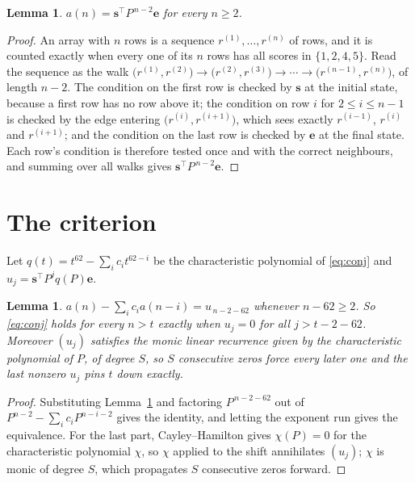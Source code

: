 \documentclass[11pt,a4paper]{article}
\theoremstyle{plain}
\newtheorem{lemma}[theorem]{Lemma}
\theoremstyle{definition}
\begin{document}
\begin{lemma}\label{lem:walk}
$a(n)=\mathbf{s}^{\!\top}P^{\,n-2}\mathbf{e}$ for every $n\ge2$.
\end{lemma}

\begin{proof}
An array with $n$ rows is a sequence $r^{(1)},\dots,r^{(n)}$ of rows, and it is counted
exactly when every one of its $n$ rows has all scores in $\{1,2,4,5\}$. Read the sequence as the
walk $\bigl(r^{(1)},r^{(2)}\bigr)\to\bigl(r^{(2)},r^{(3)}\bigr)\to\cdots\to
\bigl(r^{(n-1)},r^{(n)}\bigr)$, of length $n-2$. The condition on the first row is
checked by $\mathbf{s}$ at the initial state, because a first row has no row above it; the
condition on row $i$ for $2\le i\le n-1$ is checked by the edge entering
$\bigl(r^{(i)},r^{(i+1)}\bigr)$, which sees exactly $r^{(i-1)}$, $r^{(i)}$ and
$r^{(i+1)}$; and the condition on the last row is checked by $\mathbf{e}$ at the final
state. Each row's condition is therefore tested once and with the correct neighbours, and
summing over all walks gives $\mathbf{s}^{\!\top}P^{\,n-2}\mathbf{e}$.
\end{proof}

\section{The criterion}

Let $q(t)=t^{62}-\sum_i c_i t^{62-i}$ be the characteristic polynomial of
\eqref{eq:conj} and $u_j=\mathbf{s}^{\!\top}P^{j}q(P)\mathbf{e}$.

\begin{lemma}\label{lem:crit}
$a(n)-\sum_i c_i a(n-i)=u_{\,n-2-62}$ whenever $n-62\ge2$. So \eqref{eq:conj}
holds for every $n>t$ exactly when $u_j=0$ for all $j>t-2-62$. Moreover $(u_j)$
satisfies the monic linear recurrence given by the characteristic polynomial of $P$, of
degree $S$, so $S$ consecutive zeros force every later one and the last nonzero $u_j$ pins
$t$ down exactly.
\end{lemma}

\begin{proof}
Substituting Lemma~\ref{lem:walk} and factoring $P^{\,n-2-62}$ out of
$P^{n-2}-\sum_i c_i P^{n-i-2}$ gives the identity, and letting the exponent run gives the
equivalence. For the last part, Cayley--Hamilton gives $\chi(P)=0$ for the characteristic
polynomial $\chi$, so $\chi$ applied to the shift annihilates $(u_j)$; $\chi$ is monic of
degree $S$, which propagates $S$ consecutive zeros forward.
\end{proof}
\end{document}

